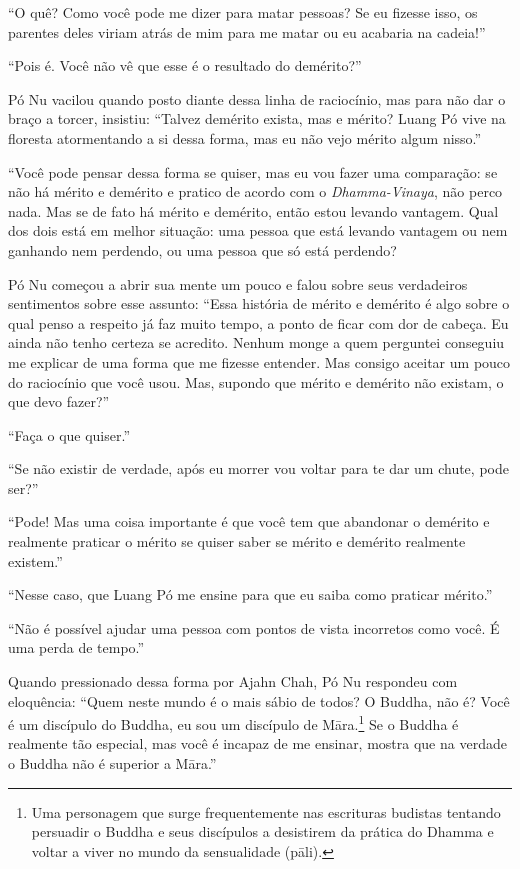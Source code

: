 ``O quê? Como você pode me dizer para matar pessoas? Se eu fizesse isso,
os parentes deles viriam atrás de mim para me matar ou eu acabaria na
cadeia!''

``Pois é. Você não vê que esse é o resultado do demérito?''

Pó Nu vacilou quando posto diante dessa linha de raciocínio, mas para
não dar o braço a torcer, insistiu: ``Talvez demérito exista, mas e
mérito? Luang Pó vive na floresta atormentando a si dessa forma, mas eu
não vejo mérito algum nisso.''

``Você pode pensar dessa forma se quiser, mas eu vou fazer uma
comparação: se não há mérito e demérito e pratico de acordo com o
\emph{Dhamma-Vinaya}, não perco nada. Mas se de fato há mérito e
demérito, então estou levando vantagem. Qual dos dois está em melhor
situação: uma pessoa que está levando vantagem ou nem ganhando nem
perdendo, ou uma pessoa que só está perdendo?

Pó Nu começou a abrir sua mente um pouco e falou sobre seus verdadeiros
sentimentos sobre esse assunto: ``Essa história de mérito e demérito é
algo sobre o qual penso a respeito já faz muito tempo, a ponto de ficar
com dor de cabeça. Eu ainda não tenho certeza se acredito. Nenhum monge
a quem perguntei conseguiu me explicar de uma forma que me fizesse
entender. Mas consigo aceitar um pouco do raciocínio que você usou. Mas,
supondo que mérito e demérito não existam, o que devo fazer?''

``Faça o que quiser.''

``Se não existir de verdade, após eu morrer vou voltar para te dar um
chute, pode ser?''

``Pode! Mas uma coisa importante é que você tem que abandonar o demérito
e realmente praticar o mérito se quiser saber se mérito e demérito
realmente existem.''

``Nesse caso, que Luang Pó me ensine para que eu saiba como praticar
mérito.''

``Não é possível ajudar uma pessoa com pontos de vista incorretos como
você. É uma perda de tempo.''

Quando pressionado dessa forma por Ajahn Chah, Pó Nu respondeu com
eloquência: ``Quem neste mundo é o mais sábio de todos? O Buddha, não é?
Você é um discípulo do Buddha, eu sou um discípulo de Māra.\footnote{Uma
  personagem que surge frequentemente nas escrituras budistas tentando
  persuadir o Buddha e seus discípulos a desistirem da prática do Dhamma
  e voltar a viver no mundo da sensualidade (pāli).} Se o Buddha é
realmente tão especial, mas você é incapaz de me ensinar, mostra que na
verdade o Buddha não é superior a Māra.''

